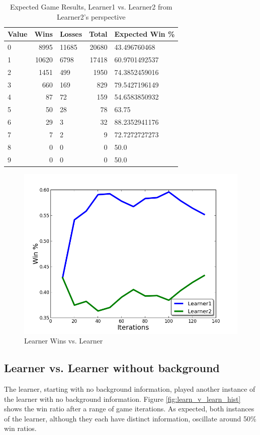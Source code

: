 \documentclass[12pt,pdftex]{article}
\begin{document}
\begin{table}[hb!]
\centering
\begin{tabular}{| l | r | l | r | l |}
	\hline
 \textbf{Value} & \textbf{Wins}& \textbf{Losses}& \textbf{Total}& \textbf{Expected Win \%}\\
\hline
0& 8995& 11685& 20680& 43.496760468\\
1& 10620& 6798& 17418& 60.9701492537\\
2& 1451& 499& 1950& 74.3852459016\\
3& 660& 169& 829& 79.5427196149\\
4& 87& 72& 159& 54.6583850932\\
5& 50& 28& 78& 63.75\\
6& 29& 3& 32& 88.2352941176\\
7& 7& 2& 9& 72.7272727273\\
8& 0& 0& 0& 50.0\\
9& 0& 0& 0& 50.0\\
\hline
\end{tabular}
\caption{Expected Game Results, Learner1 vs. Learner2 from Learner2's perspective}
\label{tab:learner2_v_learner}
\end{table}

\begin{figure}[ht!]
	\begin{center}
		\includegraphics[scale=0.5]{figs/learnervlearner.png}
		\caption{Learner Wins vs. Learner}
		\label{fig:learn_v_learn}
\end{center}
\end{figure}

\subsection{Learner vs. Learner without background}
The learner, starting with no background information, played another instance of the learner with no background information.
Figure \ref{fig:learn_v_learn_hist} shows the win ratio after a range of game iterations.
As expected, both instances of the learner, although they each have distinct information, oscillate around 50\% win ratios.
\end{document}
